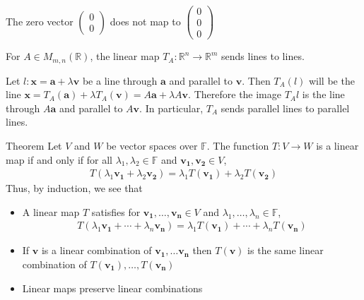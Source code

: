 \documentclass{report}
\renewcommand{\vec}{\mathbf}
\newcommand{\cvec}[1]{ \begin{pmatrix} #1 \end{pmatrix} }
\begin{document}
\begin{enumerate}
	The zero vector $\cvec{0\\0}$ does not map to $\cvec{0\\0\\0}$

	For $A \in M_{m,n}(\mathbb{R})$, the linear map $T_A: \mathbb{R}^n \to \mathbb{R}^m$ sends lines to lines.

	Let $l: \vec{x} = \vec{a} + \lambda \vec{v}$ be a line through $\vec{a}$ and parallel to $\vec{v}$. Then $T_A(l)$ will be the line $\vec{x} = T_A(\vec{a}) + \lambda T_A(\vec{v}) = A\vec{a} + \lambda A \vec{v}$. Therefore the image $T_A{l}$ is the line through $A\vec{a}$ and parallel to $A \vec{v}$. In particular, $T_A$ sends parallel lines to parallel lines.

	\begin{question}{Theorem}
		Let $V$ and $W$ be vector spaces over $\mathbb{F}$. The function $T: V \to W$ is a linear map if and only if for all $\lambda_1, \lambda_2 \in \mathbb{F}$ and $\vec{v_1}, \vec{v_2} \in V$,
		\begin{align*}
			T(\lambda_1 \vec{v_1} + \lambda_2 \vec{v_2}) = \lambda_1 T(\vec{v_1}) +\lambda_2 T(\vec{v_2}) 
		\end{align*}
		Thus, by induction, we see that
		\begin{itemize}
			\item A linear map $T$ satisfies for $\vec{v_1}, \dots, \vec{v_n} \in V$ and $\lambda_1, \dots, \lambda_n \in \mathbb{F}$,
				\begin{align*}
					T(\lambda_1\vec{v_1} + \cdots + \lambda_n\vec{v_n}) = \lambda_1 T(\vec{v_1}) + \cdots + \lambda_n T(\vec{v_n})
				\end{align*}
			\item If $\vec{v}$ is a linear combination of $\vec{v_1}, \dots \vec{v_n}$ then $T(\vec{v})$ is the same linear combination of $T(\vec{v_1}), \dots, T(\vec{v_n})$
			\item Linear maps preserve linear combinations
		\end{itemize}
	\end{question}


\end{enumerate}
\end{document}
